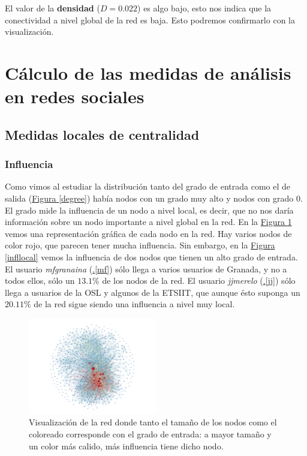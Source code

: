 \documentclass[10pt,a4paper,spanish]{article}
\numberwithin{equation}{section} %
\numberwithin{figure}{section} %
\numberwithin{table}{section} %
\begin{document}
El valor de la \textbf{densidad} ($D = 0.022$) es algo bajo, esto nos indica que la conectividad a nivel global de la red es baja. Esto podremos confirmarlo con la visualización.

\section{Cálculo de las medidas de análisis en redes sociales}

\subsection{Medidas locales de centralidad}

\subsubsection{Influencia}
Como vimos al estudiar la distribución tanto del grado de entrada como el de salida (\hyperref[degree]{Figura \ref*{degree}}) había nodos con un grado muy alto y nodos con grado 0. El grado mide la influencia de un nodo a nivel local, es decir, que no nos daría información sobre un nodo importante a nivel global en la red. En la \hyperref[influencia]{Figura \ref*{influencia}} vemos una representación gráfica de cada nodo en la red. Hay varios nodos de color rojo, que parecen tener mucha influencia. Sin embargo, en la \hyperref[infllocal]{Figura \ref*{infllocal}} vemos la influencia de dos nodos que tienen un alto grado de entrada. El usuario \textit{mfgranaina} (\hyperref[mf]{\thesection .\ref*{mf}}) sólo llega a varios usuarios de Granada, y no a todos ellos, sólo un $13.1\%$ de los nodos de la red. El usuario \textit{jjmerelo} (\hyperref[jj]{\thesection .\ref*{jj}}) sólo llega a usuarios de la OSL y algunos de la ETSIIT, que aunque ésto suponga un $20.11\%$ de la red sigue siendo una influencia a nivel muy local.

\begin{figure}[!h]
    \centering
    \includegraphics[width=0.5\textwidth]{medidas_locales/influencia}
    \caption{Visualización de la red donde tanto el tamaño de los nodos como el coloreado corresponde con el grado de entrada: a mayor tamaño y un color más calido, más influencia tiene dicho nodo.}
    \label{influencia}
\end{figure}
\end{document}
